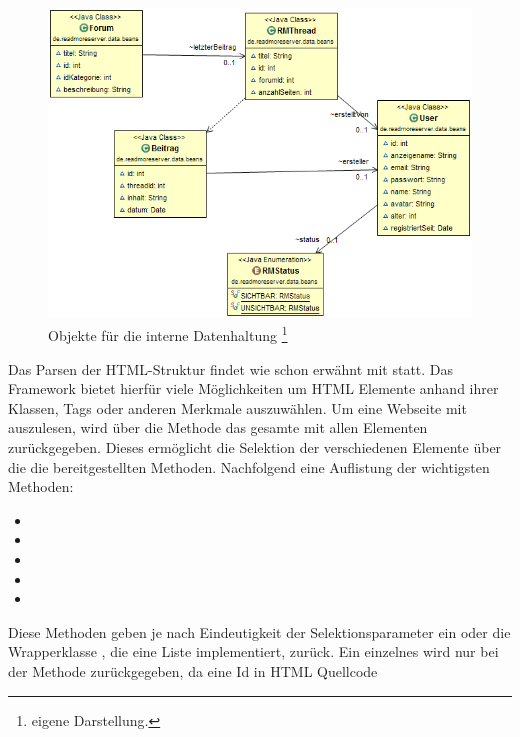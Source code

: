 \begin{figure}[!htbp]
\centering
\includegraphics[width=\textwidth]{Bilder/beans.png}
\caption[Objekte für die interne Datenhaltung]{Objekte für die interne Datenhaltung \protect\footnote{eigene Darstellung.} }
\label{dminfo}
\end{figure}
Das Parsen der HTML-Struktur findet wie schon erwähnt mit 
statt. Das Framework bietet hierfür viele Möglichkeiten um HTML Elemente anhand
ihrer Klassen, Tags oder anderen Merkmale auszuwählen. Um eine Webseite mit
 auszulesen, wird über die Methode 
das gesamte  mit allen Elementen zurückgegeben. Dieses
 ermöglicht die Selektion der verschiedenen Elemente über die
die bereitgestellten Methoden. Nachfolgend eine Auflistung der wichtigsten
Methoden:
\begin{itemize}
  \item {}
  \item {}
  \item {}
  \item {}
  \item {}
\end{itemize}
Diese Methoden geben je nach Eindeutigkeit der Selektionsparameter ein
 oder die Wrapperklasse , die eine Liste
implementiert, zurück. Ein einzelnes  wird nur bei der Methode
 zurückgegeben, da eine Id in HTML Quellcode
